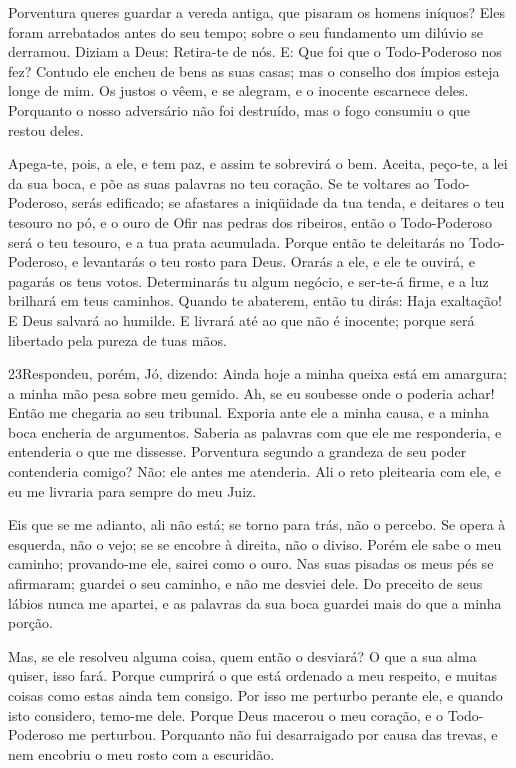 Porventura queres guardar a vereda antiga, que pisaram os homens
iníquos? Eles foram arrebatados antes do seu tempo; sobre o
seu fundamento um dilúvio se derramou. Diziam a Deus:
Retira-te de nós. E: Que foi que o Todo-Poderoso nos fez?
Contudo ele encheu de bens as suas casas; mas o conselho dos
ímpios esteja longe de mim. Os justos o vêem, e se alegram, e
o inocente escarnece deles. Porquanto o nosso adversário não
foi destruído, mas o fogo consumiu o que restou deles.

Apega-te, pois, a ele, e tem paz, e assim te sobrevirá o bem.
Aceita, peço-te, a lei da sua boca, e põe as suas palavras no
teu coração. Se te voltares ao Todo-Poderoso, serás
edificado; se afastares a iniqüidade da tua tenda, e deitares
o teu tesouro no pó, e o ouro de Ofir nas pedras dos ribeiros,
então o Todo-Poderoso será o teu tesouro, e a tua prata
acumulada. Porque então te deleitarás no Todo-Poderoso, e
levantarás o teu rosto para Deus. Orarás a ele, e ele te
ouvirá, e pagarás os teus votos. Determinarás tu algum
negócio, e ser-te-á firme, e a luz brilhará em teus caminhos.
Quando te abaterem, então tu dirás: Haja exaltação! E Deus
salvará ao humilde. E livrará até ao que não é inocente;
porque será libertado pela pureza de tuas mãos.

\medskip

\lettrine{23} Respondeu, porém, Jó, dizendo: Ainda hoje a
minha queixa está em amargura; a minha mão pesa sobre meu gemido.
Ah, se eu soubesse onde o poderia achar! Então me chegaria ao
seu tribunal. Exporia ante ele a minha causa, e a minha boca
encheria de argumentos. Saberia as palavras com que ele me
responderia, e entenderia o que me dissesse. Porventura segundo
a grandeza de seu poder contenderia comigo? Não: ele antes me
atenderia. Ali o reto pleitearia com ele, e eu me livraria para
sempre do meu Juiz.

Eis que se me adianto, ali não está; se torno para trás, não o
percebo. Se opera à esquerda, não o vejo; se se encobre à
direita, não o diviso. Porém ele sabe o meu caminho;
provando-me ele, sairei como o ouro. Nas suas pisadas os meus
pés se afirmaram; guardei o seu caminho, e não me desviei dele.
Do preceito de seus lábios nunca me apartei, e as palavras da
sua boca guardei mais do que a minha porção.

Mas, se ele resolveu alguma coisa, quem então o desviará? O que a
sua alma quiser, isso fará. Porque cumprirá o que está
ordenado a meu respeito, e muitas coisas como estas ainda tem
consigo. Por isso me perturbo perante ele, e quando isto
considero, temo-me dele. Porque Deus macerou o meu coração, e
o Todo-Poderoso me perturbou. Porquanto não fui desarraigado
por causa das trevas, e nem encobriu o meu rosto com a escuridão.

